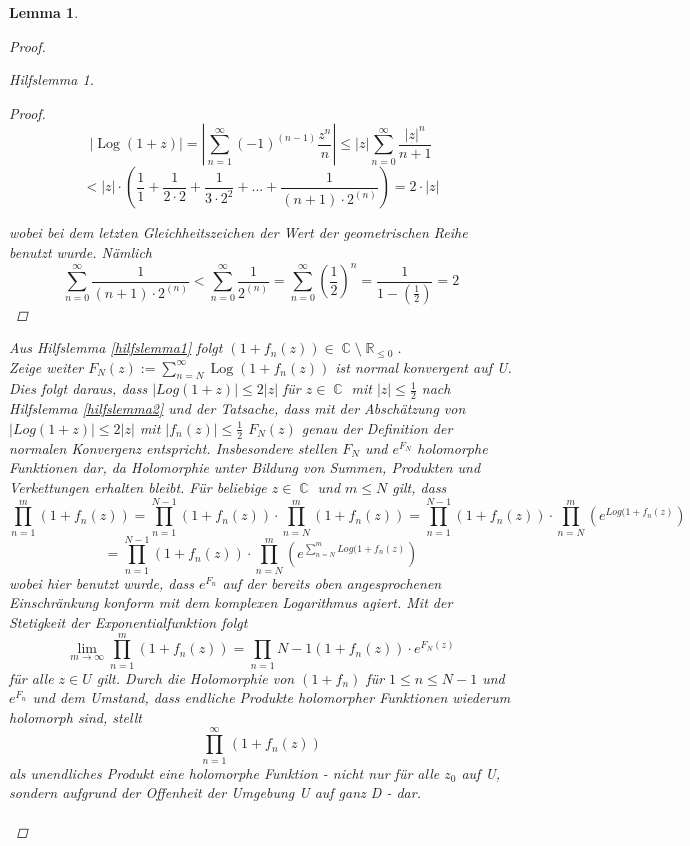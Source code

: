 \documentclass[10pt,a4paper]{article}
\theoremstyle{plain}
\newtheorem{lem}[thm]{Lemma}
\theoremstyle{definition}
\theoremstyle{remark}
\newtheorem{hilfslem}{Hilfslemma}
\DeclareMathOperator{\R}{\mathbb{R}}
\DeclareMathOperator{\C}{\mathbb{C}}
\DeclareMathOperator{\Log}{Log}
\begin{document}
\begin{lem}
\begin{proof}
\begin{hilfslem}
\begin{proof}
$$|\Log(1+z)|= |\sum_{n = 1}^\infty (-1)^{(n-1)}\frac{z^{n}}{n}|\leq|z|\sum_{n = 0}^\infty\frac{|z|^{n}}{n + 1}$$
$$< |z|\cdot (\frac{1}{1}+\frac{1}{2\cdot 2}+\frac{1}{3 \cdot2^2}+...+\frac{1}{(n+1)\cdot2^(n)}) = 2\cdot|z| $$

wobei bei dem letzten Gleichheitszeichen der Wert der geometrischen Reihe benutzt wurde. Nämlich $$\sum_{n=0}^{\infty}\frac{1}{(n+1)\cdot2^{(n)}} < \sum_{n=0}^{\infty}\frac{1}{2^{(n)}} = \sum_{n=0}^{\infty}(\frac{1}{2})^n = \frac{1}{1-(\frac{1}{2})} = 2 $$

\end{proof}
\end{hilfslem}
 Aus Hilfslemma \ref{hilfslemma1} folgt $(1 + f_{n}(z)) \in \C \setminus \R_{\leq 0 }$. \\
 Zeige weiter $F_{N}(z) := \sum_{n = N}^\infty \Log( 1 + f_{n}(z))$ ist normal konvergent auf U. Dies folgt daraus, dass $| Log( 1 + z) | \leq 2|z| $ für $z \in \C$ mit $|z| \leq \frac{1}{2}$ nach Hilfslemma \ref{hilfslemma2}  und der Tatsache, dass mit der Abschätzung von $|Log(1+z)| \leq 2|z|$ mit $|f_n(z)|\leq \frac{1}{2}$ $F_{N}(z)$ genau der Definition der normalen Konvergenz entspricht.
Insbesondere stellen $F_{N}$ und $e^{F_{N}}$ holomorphe Funktionen dar, da Holomorphie unter Bildung von Summen, Produkten und Verkettungen erhalten bleibt. Für beliebige $z \in \C $ und $m\leq N$ gilt, dass $$\prod_{n = 1 }^{m}( 1 + f_{n}(z)) = \prod_{n = 1}^{N - 1}( 1 + f_{n}(z))\cdot\prod_{n = N}^{m}( 1 + f_{n}(z))= \prod_{n = 1}^{N - 1}( 1 + f_{n}(z))\cdot\prod_{n = N}^{m}(e^{Log( 1 + f_{n}(z)}) $$ $$= \prod_{n = 1}^{N - 1}( 1 + f_{n}(z))\cdot\prod_{n = N}^{m}(e^{\sum_{n = N}^{m}Log( 1 + f_{n}(z)})$$wobei hier benutzt wurde, dass $e^{F_{n}}$ auf der bereits oben angesprochenen Einschränkung konform mit dem komplexen Logarithmus agiert. Mit der Stetigkeit der Exponentialfunktion folgt $$\lim_{m\rightarrow\infty}\prod_{n=1}^m ( 1 + f_{n}(z)) =\prod_{n = 1}{N - 1}(1 + f_{n}(z))\cdot e^{F_{N}(z)}$$ für alle $z \in U$ gilt. Durch die Holomorphie von $(1+ f_{n})$ für $1 \leq n \leq N - 1$ und $e^{F_{n}}$ und dem Umstand, dass endliche Produkte holomorpher Funktionen wiederum holomorph sind, stellt $$\prod_{n =1}^{\infty}(1 +f_n (z))$$ als unendliches Produkt eine holomorphe Funktion - nicht nur für alle $z_0$ auf U, sondern aufgrund der Offenheit der Umgebung U auf ganz D - dar.
\\
\\
\end{proof}
\end{lem}
\end{document}
